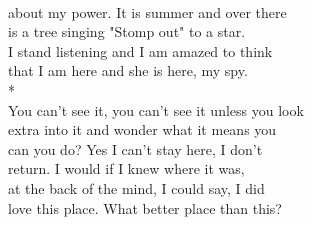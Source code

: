 \documentclass[smalldemyvopaper,11pt,twoside,onecolumn,openright,extrafontsizes]{memoir}
\begin{document}
\\about my power. It is summer and over there
\\is a tree singing "Stomp out" to a star.
\\I stand listening and I am amazed to think
\\that I am here and she is here, my spy.
\\*
\\You can't see it, you can't see it unless you look
\\extra into it and wonder what it means you
\\can you do? Yes I can't stay here, I don't
\\return. I would if I knew where it was,
\\at the back of the mind, I could say, I did
\\love this place. What better place than this?
\end{document}
